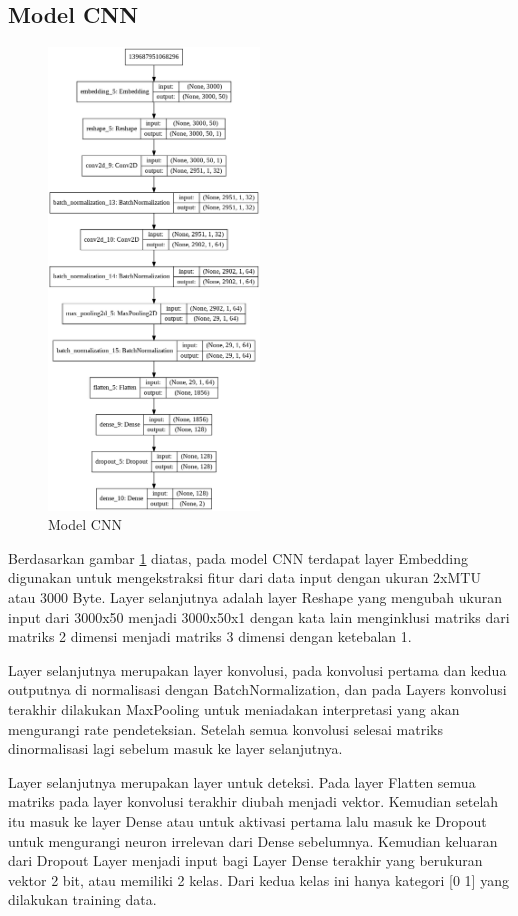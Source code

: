 \documentclass[./skripsi.tex]{subfiles}
\begin{document}
\subsection{Model CNN}
\begin{figure}[H]
    \centering
    \includegraphics[width=0.5\textwidth]{public/assets/img/CNNModel.png}
    \caption{Model CNN}
    \label{fig:model_cnn}
\end{figure}
\setlength{\textfloatsep}{0.7\baselineskip plus 0.2\baselineskip minus 0.5\baselineskip}
\par Berdasarkan gambar \ref{fig:model_cnn} diatas, pada model CNN terdapat layer Embedding digunakan untuk mengekstraksi fitur dari data input dengan ukuran 2xMTU atau 3000 Byte. Layer selanjutnya adalah layer Reshape yang mengubah ukuran input dari 3000x50 menjadi 3000x50x1 dengan kata lain menginklusi matriks dari matriks 2 dimensi menjadi matriks 3 dimensi dengan ketebalan 1.
\par Layer selanjutnya merupakan layer konvolusi, pada konvolusi pertama dan kedua outputnya di normalisasi dengan BatchNormalization, dan pada Layers konvolusi terakhir dilakukan MaxPooling untuk meniadakan interpretasi yang akan mengurangi rate pendeteksian. Setelah semua konvolusi selesai matriks dinormalisasi lagi sebelum masuk ke layer selanjutnya.
\par Layer selanjutnya merupakan layer untuk deteksi. Pada layer Flatten semua matriks pada layer konvolusi terakhir diubah menjadi vektor. Kemudian setelah itu masuk ke layer Dense atau untuk aktivasi pertama lalu masuk ke Dropout untuk mengurangi neuron irrelevan dari Dense sebelumnya. Kemudian keluaran dari Dropout Layer menjadi input bagi Layer Dense terakhir yang berukuran vektor 2 bit, atau memiliki 2 kelas. Dari kedua kelas ini hanya kategori [0 1] yang dilakukan training data.
\end{document}
